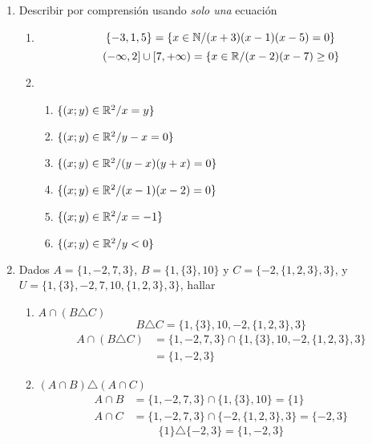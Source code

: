 \documentclass[../practica.root.tex]{subfiles}
\begin{document}
\begin{enumerate}
    \item Describir por comprensión usando \textit{solo una} ecuación
          \begin{enumerate}
              \item
                    \[ \{-3, 1, 5\} = \{x \in \mathbb{N} / (x+3)(x-1)(x-5) = 0\} \]
                    \[ (-\infty, 2]\cup[7, +\infty) = \{x \in \mathbb{R} / (x-2)(x-7) \geq 0\}\]
              \item
                    \begin{enumerate}
                        \item $\{(x; y) \in \mathbb{R}^2 / x = y\}$
                        \item $\{(x; y) \in \mathbb{R}^2 / y-x = 0\}$
                        \item $\{(x; y) \in \mathbb{R}^2 / (y-x)(y+x) = 0\}$
                        \item $\{(x; y) \in \mathbb{R}^2 / (x-1)(x-2) = 0\}$
                        \item $\{(x; y) \in \mathbb{R}^2 / x = -1\}$
                        \item $\{(x; y) \in \mathbb{R}^2 / y < 0\}$
                    \end{enumerate}
          \end{enumerate}

    \item Dados $A = \{1, -2, 7, 3\}$, $B = \{1, \{3\}, 10\}$ y $C = \{-2, \{1, 2, 3\}, 3\}$, y
          $U = \{1, \{3\}, -2, 7, 10, \{1,2,3\},3\}$, hallar
          \begin{enumerate}
              \item $A \cap (B \triangle C)$
                    \[ B \triangle C = \{1, \{3\}, 10, -2 , \{1, 2, 3\}, 3\} \]
                    \begin{align*}
                        A \cap (B \triangle C) & = \{1, -2, 7, 3\}\cap\{1, \{3\}, 10, -2 , \{1, 2, 3\}, 3\} \\
                                               & = \boxed{\{1, -2, 3\}}
                    \end{align*}

              \item $(A \cap B)\triangle(A \cap C)$
                    \begin{align*}
                        A \cap B & =  \{1, -2, 7, 3\} \cap \{1, \{3\}, 10\} = \{1\}         \\
                        A \cap C & = \{1, -2, 7, 3\} \cap \{-2, \{1, 2, 3\}, 3\} = \{-2,3\}
                    \end{align*}
                    \[ \{1\} \triangle \{-2,3\} = \boxed{\{1, -2, 3\}}\]


\end{enumerate}
\end{enumerate}
\end{document}
